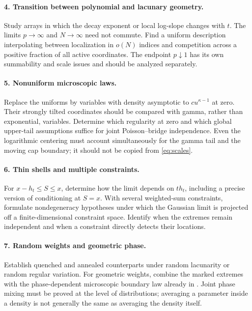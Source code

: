 \documentclass[11pt,a4paper]{article}
\numberwithin{equation}{section}
\theoremstyle{definition}
\theoremstyle{remark}
\begin{document}
\paragraph{4. Transition between polynomial and lacunary geometry.}
Study arrays in which the decay exponent or local log-slope changes
with $t$. The limits $p\to\infty$ and $N\to\infty$ need not commute.
Find a uniform description interpolating between localization in
$o(N)$ indices and competition across a positive fraction of all
active coordinates. The endpoint $p\downarrow1$ has its own
summability and scale issues and should be analyzed separately.

\paragraph{5. Nonuniform microscopic laws.}
Replace the uniforms by variables with density asymptotic to
$c u^{\kappa-1}$ at zero. Their strongly tilted coordinates should be
compared with gamma, rather than exponential, variables. Determine
which regularity at zero and which global upper-tail assumptions
suffice for joint Poisson--bridge independence. Even the logarithmic
centering must account simultaneously for the gamma tail and the
moving cap boundary; it should not be copied from \eqref{eq:scales}.

\paragraph{6. Thin shells and multiple constraints.}
For $x-h_t\le S\le x$, determine how the limit depends on $th_t$,
including a precise version of conditioning at $S=x$. With several
weighted-sum constraints, formulate nondegeneracy hypotheses under
which the Gaussian limit is projected off a finite-dimensional
constraint space. Identify when the extremes remain independent and
when a constraint directly detects their locations.

\paragraph{7. Random weights and geometric phase.}
Establish quenched and annealed counterparts under random lacunarity
or random regular variation. For geometric weights, combine the
marked extremes with the phase-dependent microscopic boundary law
already in \cite{repolac,repounif}. Joint phase mixing must be proved
at the level of distributions; averaging a parameter inside a density
is not generally the same as averaging the density itself.
\end{document}
